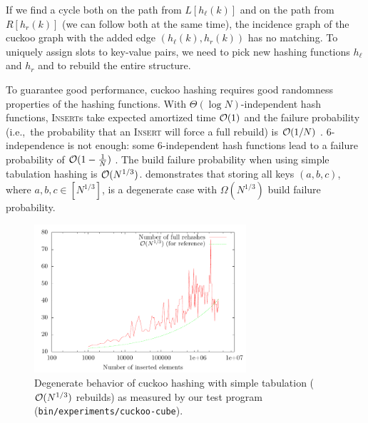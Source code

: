If we find a cycle both on the path from $L[h_\ell(k)]$ and on the path from
$R[h_r(k)]$ (we can follow both at the same time), the incidence graph
of the cuckoo graph with the added edge $(h_\ell(k),h_r(k))$ has no matching.
To uniquely assign slots to key-value pairs, we need to pick new hashing
functions $h_\ell$ and $h_r$ and to rebuild the entire structure.

To guarantee good performance, cuckoo hashing requires good randomness
properties of the hashing functions.
With $\Theta(\log N)$-independent hash functions, \textsc{Insert}s take
expected amortized time $\mathcal{O}(1)$ and the failure probability (i.e.,\ the
probability that an \textsc{Insert} will force a full rebuild) is
$\mathcal{O}(1/N)$ \cite{cuckoo-hashing}.
6-independence is not enough: some 6-independent hash functions lead to a
failure probability of $\mathcal{O}(1-\frac{1}{N})$ \cite{cuckoo-hashing-indep-bounds}.
The build failure probability when using simple tabulation hashing is
$\mathcal{O}(N^{1/3})$. \cite{power-of-simple-tab} demonstrates that storing all keys
$(a,b,c)$, where $a,b,c\in[N^{1/3}]$, is a degenerate case with
$\Omega(N^{1/3})$ build failure probability.

\begin{figure}
	\centering
	\includegraphics[width=0.7\textwidth]{img/cuckoo/results}
	\caption{Degenerate behavior of cuckoo hashing
		with simple tabulation ($\mathcal{O}(N^{1/3})$ rebuilds)
		as measured by our test program (\texttt{bin/experiments/cuckoo-cube}).}
\end{figure}

